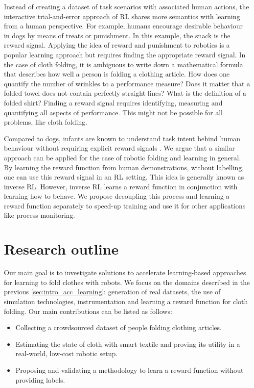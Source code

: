 \documentclass[\home/main.tex]{subfiles}
\begin{document}
Instead of creating a dataset of task scenarios with associated human actions, the interactive trial-and-error approach of \gls{RL} shares more semantics with learning from a human perspective. For example, humans encourage desirable behaviour in dogs by means of treats or punishment. In this example, the snack is the reward signal. Applying the idea of reward and punishment to robotics is a popular learning approach but requires finding the appropriate reward signal. In the case of cloth folding, it is ambiguous to write down a mathematical formula that describes how well a person is folding a clothing article. How does one quantify the number of wrinkles to a performance measure? Does it matter that a folded towel does not contain perfectly straight lines? What is the definition of a folded shirt? Finding a reward signal requires identifying, measuring and quantifying all aspects of performance. This might not be possible for all problems, like cloth folding.

Compared to dogs, infants are known to understand task intent behind human behaviour without requiring explicit reward signals \autocite{warneken2006altruistic}.
We argue that a similar approach can be applied for the case of robotic folding and learning in general. By learning the reward function from human demonstrations, without labelling, one can use this reward signal in an \gls{RL} setting. This idea is generally known as inverse \gls{RL}. However, inverse RL learns a reward function in conjunction with learning how to behave. We propose decoupling this process and learning a reward function separately to speed-up training and use it for other applications like process monitoring.

\section{Research outline}
Our main goal is to investigate solutions to accelerate learning-based approaches for learning to fold clothes with robots. We focus on the domains described in the previous \cref{sec:intro_acc_learning}: generation of real datasets, the use of simulation technologies, instrumentation and learning a reward function for cloth folding. Our main contributions can be listed as follows:
\begin{itemize}
    \item Collecting a crowdsourced dataset of people folding clothing articles.
    \item Estimating the state of cloth with smart textile and proving its utility in a real-world, low-cost robotic setup.
    \item Proposing and validating a methodology to learn a reward function without providing labels.
\end{itemize}
\end{document}
